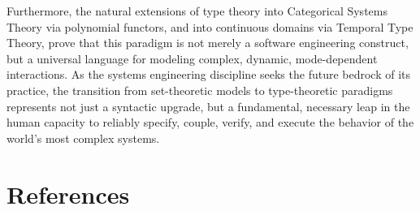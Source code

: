 \documentclass[11pt]{article}
\begin{document}
Furthermore, the natural extensions of type theory into Categorical Systems Theory via polynomial functors, and into continuous domains via Temporal Type Theory, prove that this paradigm is not merely a software engineering construct, but a universal language for modeling complex, dynamic, mode-dependent interactions. As the systems engineering discipline seeks the future bedrock of its practice, the transition from set-theoretic models to type-theoretic paradigms represents not just a syntactic upgrade, but a fundamental, necessary leap in the human capacity to reliably specify, couple, verify, and execute the behavior of the world's most complex systems.


\section{References}
\printbibliography[heading=none]
\end{document}
